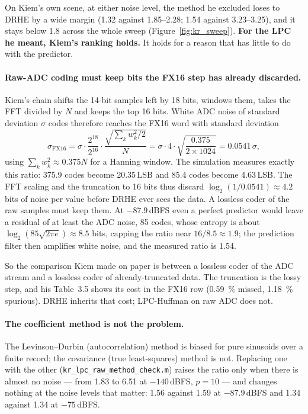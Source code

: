 \noindent
On Kiem's own scene, at either noise level, the method he excluded loses to
DRHE by a wide margin (1.32 against 1.85--2.28; 1.54 against 3.23--3.25), and
it stays below 1.8 across the whole sweep (Figure~\ref{fig:kr_sweep}).
\textbf{For the LPC he meant, Kiem's ranking holds.} It holds for a reason that
has little to do with the predictor.

\paragraph{Raw-ADC coding must keep bits the FX16 step has already discarded.}
Kiem's chain shifts the 14-bit samples left by 18 bits, windows them, takes the
FFT divided by $N$ and keeps the top 16 bits. White ADC noise of standard
deviation $\sigma$ codes therefore reaches the FX16 word with standard
deviation
\begin{equation}
\label{eq:kr_noisemap}
\sigma_{\mathrm{FX16}} = \sigma \cdot \frac{2^{18}}{2^{16}} \cdot
\frac{\sqrt{\sum_k w_k^2 / 2}}{N}
= \sigma \cdot 4 \cdot \sqrt{\frac{0.375}{2 \times 1024}} = 0.0541\,\sigma,
\end{equation}
using $\sum_k w_k^2 \approx 0.375N$ for a Hanning window. The simulation
measures exactly this ratio: 375.9 codes become 20.35\,LSB and 85.4 codes become
4.63\,LSB. The FFT scaling and the truncation to 16 bits thus discard
$\log_2(1/0.0541) \approx 4.2$ bits of noise per value before DRHE ever sees the
data. A lossless coder of the raw samples must keep them. At $-87.9$\,dBFS even a
perfect predictor would leave a residual of at least the ADC noise, 85 codes,
whose entropy is about $\log_2(85\sqrt{2\pi e}) \approx 8.5$ bits, capping the
ratio near $16/8.5 \approx 1.9$; the prediction filter then amplifies white
noise, and the measured ratio is 1.54.

So the comparison Kiem made on paper is between a lossless coder of the ADC
stream and a lossless coder of already-truncated data. The truncation is the
lossy step, and his Table~3.5 shows its cost in the FX16 row
(\SI{0.59}{\percent} missed, \SI{1.18}{\percent} spurious). DRHE inherits that
cost; LPC-Huffman on raw ADC does not.

\paragraph{The coefficient method is not the problem.} The Levinson--Durbin
(autocorrelation) method is biased for pure sinusoids over a finite record; the
covariance (true least-squares) method is not. Replacing one with the other
(\texttt{kr\_lpc\_raw\_method\_check.m}) raises the ratio only when there is
almost no noise --- from 1.83 to 6.51 at $-140$\,dBFS, $p = 10$ --- and changes
nothing at the noise levels that matter: 1.56 against 1.59 at $-87.9$\,dBFS and
1.34 against 1.34 at $-75$\,dBFS.

